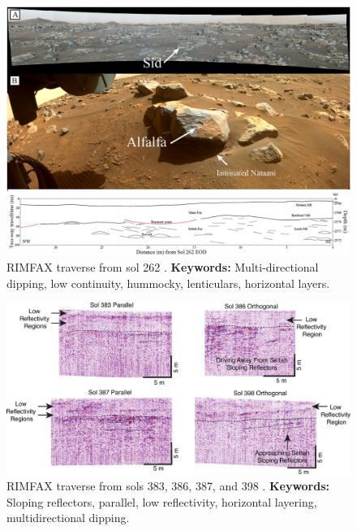 \begin{figure}[h!]
    \centering
    \includegraphics[width=0.9\linewidth]{Figures/0.5RIMFAX/Simon_2023-fig-07.jpg}
    \caption[RIMFAX traverse from sol 262.]{RIMFAX traverse from sol 262 \citep{Simon2023}. \textbf{Keywords:} Multi-directional dipping, low continuity, hummocky, lenticulars, horizontal layers.}
    \label{fig:Simon23-7}
\end{figure}
\clearpage
\begin{figure}[h!]
    \centering
    \includegraphics[width=0.9\linewidth]{Figures/0.5RIMFAX/Shoemaker_2024-f4.jpg}
    \caption[RIMFAX traverse from sols 383, 386, 387, and 398.]{RIMFAX traverse from sols 383, 386, 387, and 398 \citep{shoemaker2024}. \textbf{Keywords:} Sloping reflectors, parallel, low reflectivity, horizontal layering, multidirectional dipping.}
    \label{fig:Shoemaker24-4}
\end{figure}

